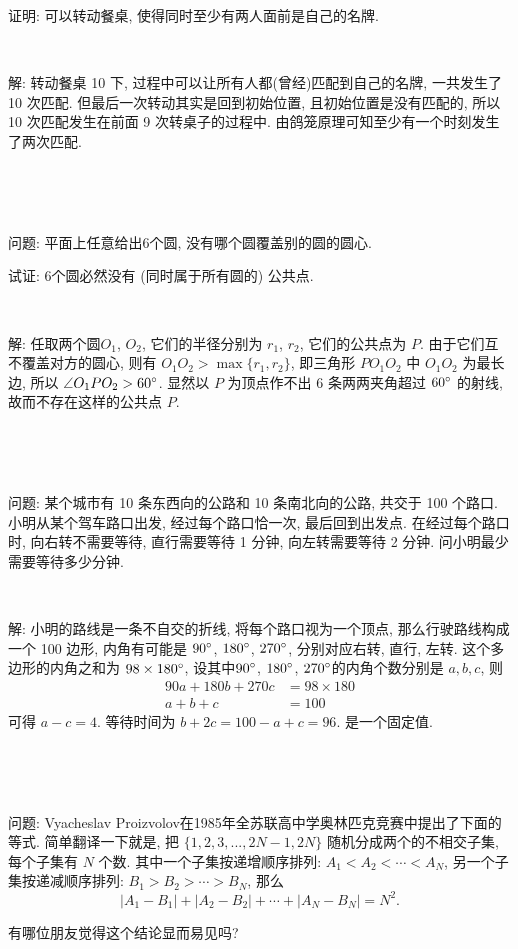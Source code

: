 证明: 可以转动餐桌, 使得同时至少有两人面前是自己的名牌.

~

解: 转动餐桌 10 下, 过程中可以让所有人都(曾经)匹配到自己的名牌, 一共发生了 10 次匹配. 但最后一次转动其实是回到初始位置, 且初始位置是没有匹配的, 所以 10 次匹配发生在前面 9 次转桌子的过程中. 由鸽笼原理可知至少有一个时刻发生了两次匹配.

~

~

问题: 平面上任意给出6个圆, 没有哪个圆覆盖别的圆的圆心.

试证: 6个圆必然没有 (同时属于所有圆的) 公共点.​​​

~

解: 任取两个圆$O_1$, $O_2$, 它们的半径分别为 $r_1$, $r_2$, 它们的公共点为 $P$. 
由于它们互不覆盖对方的圆心, 则有 $O_1O_2 > \max\{r_1, r_2\}$, 即三角形 $PO_1O_2$ 中 $O_1O_2$ 为最长边, 所以 $\angle O_1PO_2 > 60\degree$. 显然以 $P$ 为顶点作不出 6 条两两夹角超过 $60\degree$ 的射线, 故而不存在这样的公共点 $P$.

~

~

问题: 某个城市有 10 条东西向的公路和 10 条南北向的公路, 共交于 100 个路口. 小明从某个驾车路口出发, 经过每个路口恰一次, 最后回到出发点. 在经过每个路口时, 向右转不需要等待, 直行需要等待 1 分钟, 向左转需要等待 2 分钟. 问小明最少需要等待多少分钟.

~

解: 小明的路线是一条不自交的折线, 将每个路口视为一个顶点, 那么行驶路线构成一个 100 边形, 内角有可能是 $90\degree$, $180\degree$, $270\degree$, 分别对应右转, 直行, 左转. 这个多边形的内角之和为 $98\times 180\degree$, 设其中$90\degree$, $180\degree$, $270\degree$的内角个数分别是 $a,b,c$, 则
\begin{align*}
90a + 180b + 270c &= 98\times 180 \\
a + b + c &= 100
\end{align*}
可得 $a-c=4$. 等待时间为 $b+2c = 100 - a + c = 96$. 是一个固定值.

~

~

问题: Vyacheslav Proizvolov在1985年全苏联高中学奥林匹克竞赛中提出了下面的等式. 
简单翻译一下就是, 把 $\{1, 2, 3, ..., 2N-1, 2N\}$ 随机分成两个的不相交子集, 每个子集有 $N$ 个数. 
其中一个子集按递增顺序排列: $ A_1 < A_2 < \cdots < A_N$, 另一个子集按递减顺序排列: $B_1 > B_2 > \cdots > B_N$, 那么 
$$ |A_1 - B_1| + |A_2 - B_2| + \cdots + |A_N - B_N| = N^2 .$$ 

有哪位朋友觉得这个结论显而易见吗?

